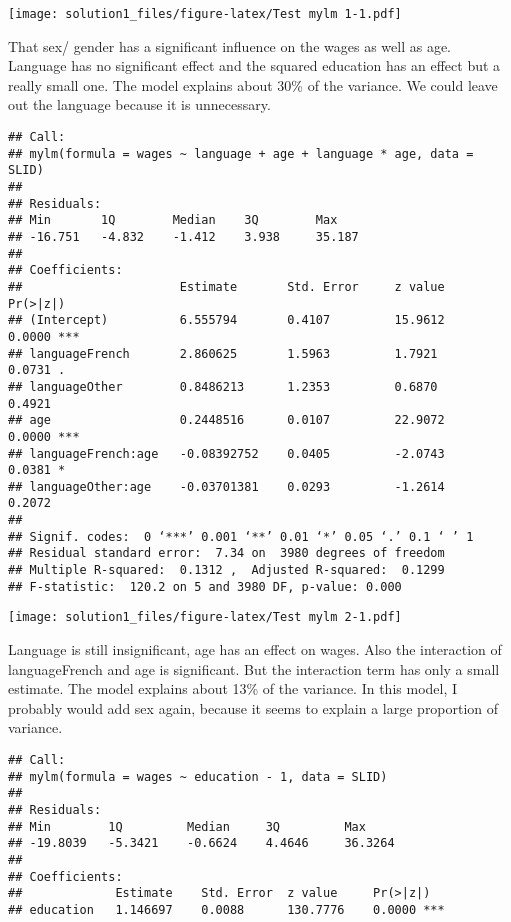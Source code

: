 \documentclass[
]{article}
\begin{document}
\texttt{[image: solution1\_files/figure-latex/Test mylm 1-1.pdf]}

That sex/ gender has a significant influence on the wages as well as
age. Language has no significant effect and the squared education has an
effect but a really small one. The model explains about 30\% of the
variance. We could leave out the language because it is unnecessary.

\begin{verbatim}
## Call:
## mylm(formula = wages ~ language + age + language * age, data = SLID)
## 
## Residuals:
## Min       1Q        Median    3Q        Max       
## -16.751   -4.832    -1.412    3.938     35.187    
## 
## Coefficients:
##                      Estimate       Std. Error     z value        Pr(>|z|)       
## (Intercept)          6.555794       0.4107         15.9612        0.0000 ***     
## languageFrench       2.860625       1.5963         1.7921         0.0731 .       
## languageOther        0.8486213      1.2353         0.6870         0.4921         
## age                  0.2448516      0.0107         22.9072        0.0000 ***     
## languageFrench:age   -0.08392752    0.0405         -2.0743        0.0381 *       
## languageOther:age    -0.03701381    0.0293         -1.2614        0.2072         
## 
## Signif. codes:  0 ‘***’ 0.001 ‘**’ 0.01 ‘*’ 0.05 ‘.’ 0.1 ‘ ’ 1
## Residual standard error:  7.34 on  3980 degrees of freedom 
## Multiple R-squared:  0.1312 ,  Adjusted R-squared:  0.1299 
## F-statistic:  120.2 on 5 and 3980 DF, p-value: 0.000
\end{verbatim}

\texttt{[image: solution1\_files/figure-latex/Test mylm 2-1.pdf]}

Language is still insignificant, age has an effect on wages. Also the
interaction of languageFrench and age is significant. But the
interaction term has only a small estimate. The model explains about
13\% of the variance. In this model, I probably would add sex again,
because it seems to explain a large proportion of variance.

\begin{verbatim}
## Call:
## mylm(formula = wages ~ education - 1, data = SLID)
## 
## Residuals:
## Min        1Q         Median     3Q         Max        
## -19.8039   -5.3421    -0.6624    4.4646     36.3264    
## 
## Coefficients:
##             Estimate    Std. Error  z value     Pr(>|z|)    
## education   1.146697    0.0088      130.7776    0.0000 ***
\end{verbatim}
\end{document}
